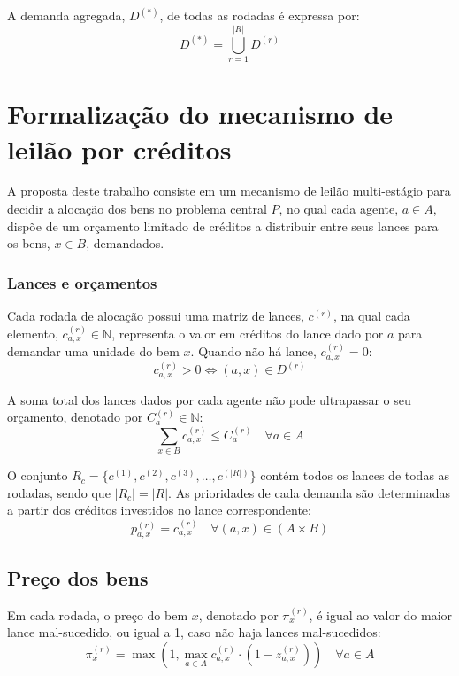 \documentclass[
    12pt,
    openany,
    oneside,
    a4paper,
    english,
    brazil
]{abntex2}
\begin{document}
A demanda agregada, $D^{(*)}$, de todas as rodadas é expressa por:
\begin{equation}
    D^{(*)} = \bigcup_{r = 1}^{|R|} D^{(r)}
\end{equation}

\section{Formalização do mecanismo de leilão por créditos}

A proposta deste trabalho consiste em um mecanismo de leilão multi-estágio para decidir a alocação dos bens no problema central $P$, no qual cada agente, $a \in A$, dispõe de um orçamento limitado de créditos a distribuir entre seus lances para os bens, $x \in B$, demandados.

\subsubsection{Lances e orçamentos}

Cada rodada de alocação possui uma matriz de lances, $c^{(r)}$, na qual cada elemento, $c_{a, x}^{(r)} \in \mathbb{N}$, representa o valor em créditos do lance dado por $a$ para demandar uma unidade do bem $x$. Quando não há lance, $c_{a, x}^{(r)} = 0$:
\begin{equation}
    c_{a, x}^{(r)} > 0 \iff (a, x) \in D^{(r)}
\end{equation}

A soma total dos lances dados por cada agente não pode ultrapassar o seu orçamento, denotado por $C_a^{(r)} \in \mathbb{N}$:
\begin{equation}
    \sum_{x \in B} c_{a, x}^{(r)} \leq C_a^{(r)} 
    \quad \forall a \in A
\end{equation}

O conjunto $R_c = \{c^{(1)}, c^{(2)}, c^{(3)}, \dots, c^{(|R|)}\}$ contém todos os lances de todas as rodadas, sendo que $|R_c| = |R|$. As prioridades de cada demanda são determinadas a partir dos créditos investidos no lance correspondente:
\begin{equation}
    p_{a, x}^{(r)} = c_{a,x}^{(r)}
    \quad 
    \forall (a, x) \in (A \times B)
\end{equation}


\subsection{Preço dos bens}

Em cada rodada, o preço do bem $x$, denotado por $\pi_x^{(r)}$, é igual ao valor do maior lance mal-sucedido, ou igual a 1, caso não haja lances mal-sucedidos:
\begin{equation}
    \pi_{x}^{(r)} = \max\left(1, \max_{a \in A}  c_{a, x}^{(r)} \cdot (1 - z_{a, x}^{(r)})\right)
    \quad
    \forall a \in A
\end{equation}
\end{document}
